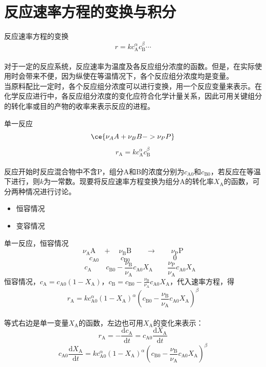 \section{反应速率方程的变换与积分}

\begin{frame}{反应速率方程的变换}
    $$r=kc_\mathrm{A}^\alpha c_\mathrm{B}^\beta\cdots $$
    \\对于一定的反应系统，反应速率为温度及各反应组分浓度的函数。但是，在实际使用时会带来不便，因为纵使在等温情况下，各个反应组分浓度均是变量。
    \\当原料配比一定时，各个反应组分浓度可以进行变换，用一个反应变量来表示。在化学反应进行中，各反应组分浓度的变化应符合化学计量关系，因此可用关键组分的转化率或目的产物的收率来表示反应的进程。
\end{frame}


\begin{frame}{单一反应}
    $$\ce {\nu_A A + \nu_B B -> \nu_P P}$$
    $$r_\mathrm{A}=kc_\mathrm{A}^\alpha c_\mathrm{B}^\beta$$
    \\反应开始时反应混合物中不含P，组分A和B的浓度分别为$c_\mathrm{A0}$和$c_\mathrm{B0}$，若反应在等温下进行，则$k$为一常数。现要将反应速率方程变换为组分A的转化率$X_\mathrm{A}$的函数，可分两种情况进行讨论。
    \begin{itemize}
        \item[\bullet]  恒容情况
        \item[\bullet]  变容情况
    \end{itemize}
\end{frame}


\begin{frame}{单一反应，恒容情况}
    \vspace*{-10pt}
    \[
        \nu_\mathrm{A}\mathrm{A} \quad + \quad \nu_\mathrm{B}\mathrm{B} \qquad \to \qquad \nu_\mathrm{P}\mathrm{P}
    \]
    \[
        c_\mathrm{A0} \qquad \quad c_\mathrm{B0} \qquad \qquad \qquad 0
    \]
    \[
        \qquad c_\mathrm{A} \quad \quad c_\mathrm{B0} - \frac{\nu_\mathrm{B}}{\nu_\mathrm{A}}c_\mathrm{A0}X_\mathrm{A} \qquad \frac{\nu_\mathrm{P}}{\nu_\mathrm{A}}c_\mathrm{A0}X_\mathrm{A}
    \]
    恒容情况，$c_\mathrm{A}=c_\mathrm{A0}(1-X_\mathrm{A})$，$c_\mathrm{B}=c_\mathrm{B0}-\frac{\nu_\mathrm{B}}{\nu_\mathrm{A}}c_\mathrm{A0}X_\mathrm{A}$，代入速率方程，得
    $$r_\mathrm{A}=kc_\mathrm{A0}^\alpha(1-X_\mathrm{A})^\alpha (c_\mathrm{B0}-\frac{\nu_\mathrm{B}}{\nu_\mathrm{A}}c_\mathrm{A0}X_\mathrm{A})^\beta$$
    \\等式右边是单一变量$X_\mathrm{A}$的函数，左边也可用$X_\mathrm{A}$的变化来表示：
    $$r_\mathrm{A}=-\frac{\mathrm{d}c_\mathrm{A}}{\mathrm{d}t}=c_\mathrm{A0}\frac{\mathrm{d}X_\mathrm{A}}{\mathrm{d}t}$$
    $$c_\mathrm{A0}\frac{\mathrm{d}X_\mathrm{A}}{\mathrm{d}t}=kc_\mathrm{A0}^\alpha(1-X_\mathrm{A})^\alpha (c_\mathrm{B0}-\frac{\nu_\mathrm{B}}{\nu_\mathrm{A}}c_\mathrm{A0}X_\mathrm{A})^\beta$$
\end{frame}


